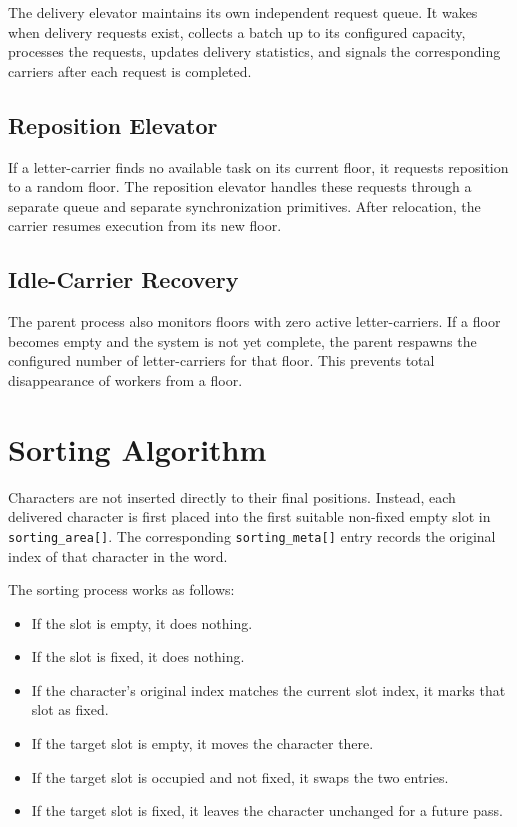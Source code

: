 \documentclass[12pt,a4paper]{article}
\begin{document}
The delivery elevator maintains its own independent request queue. It wakes when delivery requests exist, collects a batch up to its configured capacity, processes the requests, updates delivery statistics, and signals the corresponding carriers after each request is completed.

\subsection{Reposition Elevator}

If a letter-carrier finds no available task on its current floor, it requests reposition to a random floor. The reposition elevator handles these requests through a separate queue and separate synchronization primitives. After relocation, the carrier resumes execution from its new floor.

\subsection{Idle-Carrier Recovery}

The parent process also monitors floors with zero active letter-carriers. If a floor becomes empty and the system is not yet complete, the parent respawns the configured number of letter-carriers for that floor. This prevents total disappearance of workers from a floor.

\section{Sorting Algorithm}

Characters are not inserted directly to their final positions. Instead, each delivered character is first placed into the first suitable non-fixed empty slot in \texttt{sorting\_area[]}. The corresponding \texttt{sorting\_meta[]} entry records the original index of that character in the word.

The sorting process works as follows:

\begin{itemize}[leftmargin=1.5em]
\item If the slot is empty, it does nothing.
\item If the slot is fixed, it does nothing.
\item If the character's original index matches the current slot index, it marks that slot as fixed.
\item If the target slot is empty, it moves the character there.
\item If the target slot is occupied and not fixed, it swaps the two entries.
\item If the target slot is fixed, it leaves the character unchanged for a future pass.
\end{itemize}
\end{document}
